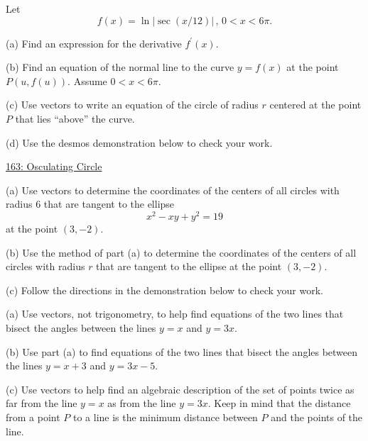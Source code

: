\documentclass{ximera}
\begin{document}
\begin{question}  \label{Qder23455243}
Let 
\[
   f(x) = \ln |\sec(x/12)| \, , \, 0<x<6\pi.
\]

(a) Find an expression for the derivative $f^\prime(x)$.
 
(b) Find an equation of the normal line to the curve $y=f(x)$ at the point $P(u,f(u))$. Assume $0<x<6\pi$.

(c) Use vectors to write an equation of the circle of radius $r$ centered at the point $P$ that lies ``above'' the curve.

(d) Use the desmos demonstration below to check your work.

\begin{onlineOnly}
    \begin{center}
\end{center}
\end{onlineOnly}

\href{https://www.desmos.com/calculator/taku9xvamz}{163: Osculating Circle}

\end{question}


\begin{question} \label{Q4df8240:Vectors}
(a) Use vectors to determine the coordinates of the centers of all circles with radius 6 that are tangent to the ellipse
\[
    x^2 - xy + y^2 = 19
\]
at the point $(3,-2)$.

(b) Use the method of part (a) to determine the coordinates of the centers of all circles with radius $r$ that are tangent to the ellipse at the point $(3,-2)$.

(c) Follow the directions in the demonstration below to check your work.

 
\begin{onlineOnly}
    \begin{center}
\end{center}
\end{onlineOnly}

\end{question}


\begin{question}   \label{Q6547:Vectors}
(a) Use vectors, not trigonometry, to help find equations of the two lines that bisect the angles between the lines $y=x$ and $y=3x$.

(b) Use part (a) to find equations of the two lines that bisect the angles between the lines $y=x+3$ and $y=3x-5$.


(c) Use vectors to help find an algebraic description of the set of points twice as far from the line $y=x$ as from the line $y=3x$. Keep in mind that the distance from a point $P$ to a line is the minimum distance between $P$ and the points of the line. 

\end{question}
\end{document}
